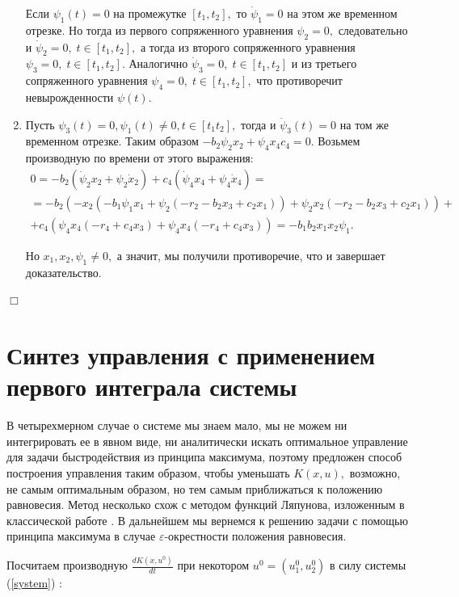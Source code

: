 \documentclass[11pt]{article}
\newenvironment{Proof}
{\par\noindent{\bf Доказательство.\\}} 
{\begin{flushright}$\Box$\end{flushright}}
\newcommand\Ref[1]{(\ref{#1})}
\newcommand\RS{\Ref{system} }
\begin{document}
\begin{Proof}
\begin{enumerate}
        Если $\psi_1(t) = 0$ на промежутке $[t_1, t_2],$ то $\dot \psi_1 = 0$ на этом же временном отрезке. Но тогда из первого сопряженного уравнения $\psi_2 = 0,$ следовательно и $\dot \psi_2 = 0, \;  t \in [t_1, t_2],$ а тогда из второго сопряженного уравнения $\psi_3 = 0, \;  t \in [t_1, t_2].$ Аналогично $\dot \psi_3 = 0, \;  t \in [t_1, t_2]$ и из третьего сопряженного уравнения $\psi_4 = 0, \;  t \in [t_1, t_2],$ что противоречит невырожденности $\psi(t).$
        
    \item
    	Пусть $\psi_3(t) = 0, \psi_1(t) \ne 0, t \in [t_1 t_2],$ тогда и $\dot \psi_3(t) = 0$ на том же временном отрезке. Таким образом $-b_2\psi_2x_2 + \psi_4x_4c_4 = 0.$ Возьмем производную по времени от этого выражения:
    	\begin{multline*}
    		0 = -b_2(\dot \psi_2x_2 + \psi_2 \dot x_2) + c_4(\dot \psi_4 x_4 + \psi_4 \dot x_4) = \\
    		= -b_2(-x_2(-b_1\psi_1x_1 + \psi_2(-r_2 - b_2x_3 + c_2x_1)) + \psi_2 x_2(-r_2 - b_2x_3 + c_2x_1)) + \\
    		+ c_4(\psi_4x_4(-r_4 + c_4x_3) + \psi_4x_4(-r_4 + c_4x_3)) = -b_1b_2x_1x_2\psi_1.
    	\end{multline*}
    	
    	Но $x_1, x_2, \psi_1 \ne 0,$ а значит, мы получили противоречие, что и завершает доказательство.
    
    \end{enumerate}    
\end{Proof}

\section{Синтез управления с применением первого интеграла системы}

	\indent В четырехмерном случае о системе мы знаем мало, мы не можем ни интегрировать ее в явном виде, ни аналитически искать оптимальное управление для задачи быстродействия из принципа максимума, поэтому предложен способ построения управления таким образом, чтобы уменьшать $K(x,u),$ возможно, не самым оптимальным образом, но тем самым приближаться к положению равновесия. Метод несколько схож с методом функций Ляпунова, изложенным в классической работе \cite{Lyapunov}. В дальнейшем мы вернемся к решению задачи с помощью принципа максимума в случае $\varepsilon$-окрестности положения равновесия.

Посчитаем производную $\frac{dK(x,u^0)}{dt}$ при некотором $u^0 = (u_1^0, u_2^0)$ в силу системы \RS:
\end{document}
